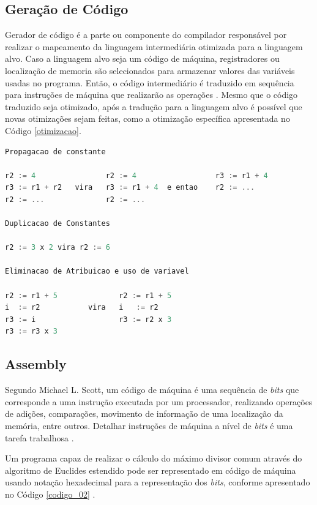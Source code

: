 \subsection{Geração de Código}

Gerador de código é a parte ou componente do compilador responsável por 
realizar o mapeamento da linguagem intermediária otimizada para a linguagem 
alvo. Caso a linguagem alvo seja um código de máquina,  registradores ou 
localização de memoria são selecionados para armazenar valores das 
variáveis usadas no programa. Então, o código intermediário é traduzido em 
sequência para instruções de máquina que realizarão as operações \cite[pág. 10]{ref3}.
Mesmo que o código traduzido seja otimizado, após a tradução para a 
linguagem alvo é  possível que novas otimizações sejam feitas, como
 a otimização específica apresentada no Código \ref{otimizacao}.


\begin{lstlisting}[language=C++, caption={Exemplos de otimização específica},
                                                              label=otimizacao]
Propagacao de constante

r2 := 4                r2 := 4                  r3 := r1 + 4
r3 := r1 + r2   vira   r3 := r1 + 4  e entao    r2 := ...
r2 := ...              r2 := ...

Duplicacao de Constantes

r2 := 3 x 2 vira r2 := 6

Eliminacao de Atribuicao e uso de variavel

r2 := r1 + 5              r2 := r1 + 5
i  := r2           vira   i   := r2
r3 := i                   r3 := r2 x 3
r3 := r3 x 3
\end{lstlisting}


\subsection{Assembly}

Segundo Michael L. Scott, um código de máquina é uma sequência de \textit{bits} que
 corresponde a uma instrução executada por um processador, realizando 
operações de adições, comparações, movimento de informação de uma localização
 da memória, entre outros. Detalhar instruções de máquina a nível de \textit{bits} é 
uma tarefa trabalhosa \cite[pág. 5]{ref6}. 

Um programa capaz de realizar o cálculo do máximo divisor comum através do 
algoritmo de Euclides estendido pode ser representado  em código de máquina 
usando notação hexadecimal para a representação dos \textit{bits}, conforme apresentado
 no Código \ref{codigo_02} \cite[pág. 5]{ref6}.


